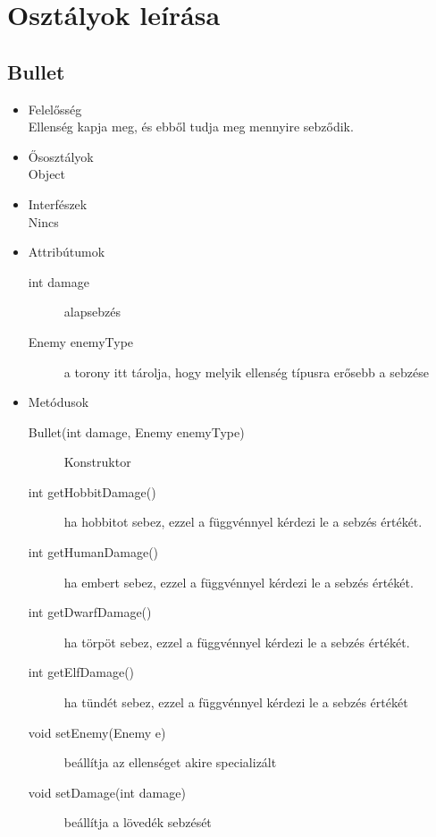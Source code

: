 \section{Osztályok leírása}

\subsection{Bullet}
\begin{itemize}
\item Felelősség\\
Ellenség kapja meg, és ebből tudja meg mennyire sebződik.
\item Ősosztályok\\
Object
\item Interfészek\\
Nincs
\item Attribútumok\\
	\begin{description}
		\item[int damage] alapsebzés
		\item[Enemy enemyType] a torony itt tárolja, hogy melyik ellenség típusra erősebb a sebzése
	\end{description}
\item Metódusok\\
	\begin{description}
		\item[Bullet(int damage, Enemy enemyType)] Konstruktor
\item[int getHobbitDamage()] ha hobbitot sebez, ezzel a függvénnyel kérdezi le a sebzés értékét. 
\item[int getHumanDamage()] ha embert sebez, ezzel a függvénnyel kérdezi le a sebzés értékét.
\item[int getDwarfDamage()] ha törpöt sebez, ezzel a függvénnyel kérdezi le a sebzés értékét.
\item[int getElfDamage()] ha tündét sebez, ezzel a függvénnyel kérdezi le a sebzés értékét
\item[void setEnemy(Enemy e)] beállítja az ellenséget akire specializált
\item[void setDamage(int damage)] beállítja a lövedék sebzését

	\end{description}
\end{itemize}


